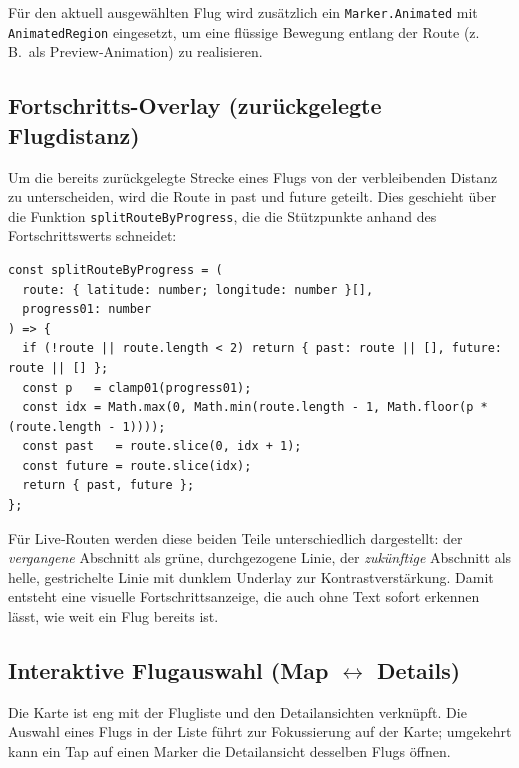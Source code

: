 Für den aktuell ausgewählten Flug wird zusätzlich ein \texttt{Marker.Animated} mit \texttt{AnimatedRegion} eingesetzt, um eine flüssige Bewegung entlang der Route (z.\,B.\ als Preview‑Animation) zu realisieren.

\subsection{Fortschritts-Overlay (zurückgelegte Flugdistanz)}

Um die bereits zurückgelegte Strecke eines Flugs von der verbleibenden Distanz zu unterscheiden, wird die Route in \glqq past\grqq{} und \glqq future\grqq{} geteilt.
Dies geschieht über die Funktion \texttt{splitRouteByProgress}, die die Stützpunkte anhand des Fortschrittswerts schneidet:

\begin{lstlisting}[style=skyline-ts,
  caption={Aufteilung einer Route in bereits geflogenen und verbleibenden Teil},
  label={lst:split_route_progress}]
const splitRouteByProgress = (
  route: { latitude: number; longitude: number }[],
  progress01: number
) => {
  if (!route || route.length < 2) return { past: route || [], future: route || [] };
  const p   = clamp01(progress01);
  const idx = Math.max(0, Math.min(route.length - 1, Math.floor(p * (route.length - 1))));
  const past   = route.slice(0, idx + 1);
  const future = route.slice(idx);
  return { past, future };
};
\end{lstlisting}

Für Live‑Routen werden diese beiden Teile unterschiedlich dargestellt: der \emph{vergangene} Abschnitt als grüne, durchgezogene Linie, der \emph{zukünftige} Abschnitt als helle, gestrichelte Linie mit dunklem Underlay zur Kontrastverstärkung.
Damit entsteht eine visuelle Fortschrittsanzeige, die auch ohne Text sofort erkennen lässt, wie weit ein Flug bereits ist.

\subsection{Interaktive Flugauswahl (Map \texorpdfstring{$\leftrightarrow$}{<->} Details)}

Die Karte ist eng mit der Flugliste und den Detailansichten verknüpft.
Die Auswahl eines Flugs in der Liste führt zur Fokussierung auf der Karte; umgekehrt kann ein Tap auf einen Marker die Detailansicht desselben Flugs öffnen.

